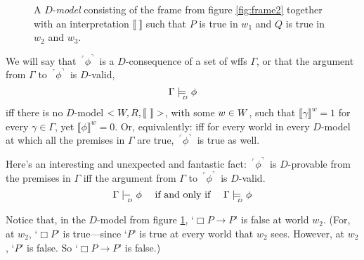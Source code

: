 \documentclass[landscape, two column, full page,reqno]{article}
\let\mathcal\relax
\newcommand{\mathcal}{\OMScal}%
\newcommand{\p}{\item}
\newcommand{\e}{\emph}
\newcommand{\qq}[1]{ ~\!^\ulcorner #1  ^\urcorner~\!}
\newcommand{\V}[1]{\llbracket #1 \rrbracket}
\newcommand{\dmodels}{\models_{\!\!\!\raisebox{-3pt}{\text{\tiny$D$}}}}
\newcommand{\dproves}{\mid\hspace{-3.9pt}-_{\!\!\!\raisebox{-3pt}{\text{\tiny$D$}}}\hspace{3pt}}
\newcommand{\B}{\Box}
\begin{document}
	\begin{figure}[t]
\centering
{}

\caption{{\small A $D$-\e{model} consisting of the frame from figure \ref{fig:frame2} together with an interpretation $\V{~}$ such that $P$ is true in $w_1$ and $Q$ is true in $w_2$ and $w_3$.} }\label{dmodel}
\end{figure}

\p We will say that $\qq{\phi}$ is a $D$-consequence of a set of wffs $\Gamma$, or that the argument from $\Gamma$ to $\qq{\phi}$ is $D$-valid,
	\[
	\Gamma \dmodels \phi
	\]
iff there is no $D$-model $< \mathcal{W}, R, \V{~} >$, with some $w \in \mathcal{W}$, such that $\V{\gamma}^w = 1$ for every $\gamma \in \Gamma$, yet $\V{\phi}^w = 0$.  Or, equivalently: iff for every  world  in every $D$-model at which all the premises in $\Gamma$ are true, $\qq{\phi}$ is true as well.

\p Here's an interesting and unexpected and fantastic fact: $\qq{\phi}$ is $D$-provable from the premises in  $\Gamma$ iff the argument from $\Gamma$ to $\qq{\phi}$ is $D$-valid.
			\[
			\Gamma \dproves \phi \quad \mbox{ if and only if } \quad \Gamma \dmodels \phi
			\]
\p Notice that, in the $D$-model from figure \ref{dmodel}, `$\B P \to P$' is false at world $w_2$.  (For, at $w_2$, `$\B P$' is true---since `$P$' is true at every world that $w_2$ sees.  However, at $w_2$, `$P$' is false.  So `$\B P \to P$' is false.)
\end{document}
